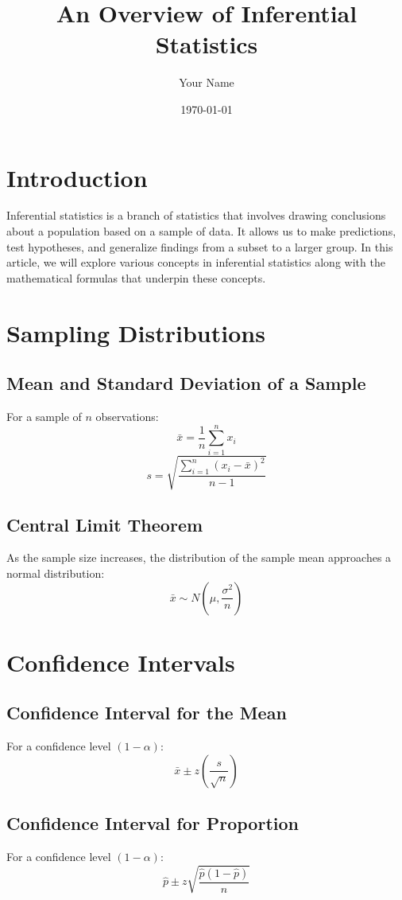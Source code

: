 \documentclass{article}
\title{An Overview of Inferential Statistics}
\author{Your Name}
\date{\today}
\begin{document}
\maketitle

\section{Introduction}
Inferential statistics is a branch of statistics that involves drawing conclusions about a population based on a sample of data. It allows us to make predictions, test hypotheses, and generalize findings from a subset to a larger group. In this article, we will explore various concepts in inferential statistics along with the mathematical formulas that underpin these concepts.

\section{Sampling Distributions}

\subsection{Mean and Standard Deviation of a Sample}
For a sample of $n$ observations:
\[
\bar{x} = \frac{1}{n} \sum_{i=1}^{n} x_i
\]
\[
s = \sqrt{\frac{\sum_{i=1}^{n} (x_i - \bar{x})^2}{n-1}}
\]

\subsection{Central Limit Theorem}
As the sample size increases, the distribution of the sample mean approaches a normal distribution:
\[
\bar{x} \sim N\left(\mu, \frac{\sigma^2}{n}\right)
\]

\section{Confidence Intervals}

\subsection{Confidence Interval for the Mean}
For a confidence level $(1 - \alpha)$:
\[
\bar{x} \pm z \left(\frac{s}{\sqrt{n}}\right)
\]

\subsection{Confidence Interval for Proportion}
For a confidence level $(1 - \alpha)$:
\[
\hat{p} \pm z \sqrt{\frac{\hat{p}(1 - \hat{p})}{n}}
\]
\end{document}
